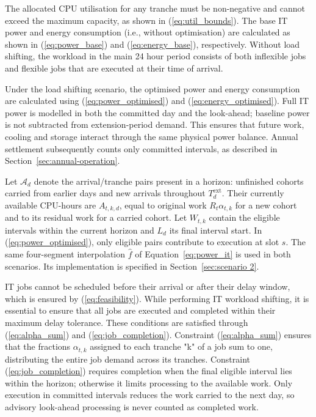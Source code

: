\documentclass[lettersize,journal]{IEEEtran}
\begin{document}
The allocated CPU utilisation for any tranche must be non-negative and cannot exceed the maximum capacity, as shown in (\ref{eq:util_bounds}). The base IT power and energy consumption (i.e., without optimisation) are calculated as shown in (\ref{eq:power_base}) and (\ref{eq:energy_base}), respectively. Without load shifting, the workload in the main 24 hour period consists of both inflexible jobs and flexible jobs that are executed at their time of arrival.

Under the load shifting scenario, the optimised power and energy consumption are calculated using (\ref{eq:power_optimised}) and (\ref{eq:energy_optimised}). Full IT power is modelled in both the committed day and the look-ahead; baseline power is not subtracted from extension-period demand. This ensures that future work, cooling and storage interact through the same physical power balance. Annual settlement subsequently counts only committed intervals, as described in Section~\ref{sec:annual-operation}.

Let $\mathcal A_d$ denote the arrival/tranche pairs present in a horizon: unfinished cohorts carried from earlier days and new arrivals throughout $T_d^{\mathrm{ext}}$. Their currently available CPU-hours are $A_{t,k,d}$, equal to original work $R_t\alpha_{t,k}$ for a new cohort and to its residual work for a carried cohort. Let $W_{t,k}$ contain the eligible intervals within the current horizon and $L_d$ its final interval start. In (\ref{eq:power_optimised}), only eligible pairs contribute to execution at slot $s$. The same four-segment interpolation $\widehat f$ of Equation~\ref{eq:power_it} is used in both scenarios. Its implementation is specified in Section~\ref{sec:scenario 2}.

IT jobs cannot be scheduled before their arrival or after their delay window, which is ensured by (\ref{eq:feasibility}). While performing IT workload shifting, it is essential to ensure that all jobs are executed and completed within their maximum delay tolerance. These conditions are satisfied through (\ref{eq:alpha_sum}) and (\ref{eq:job_completion}). Constraint (\ref{eq:alpha_sum}) ensures that the fractions $\alpha_{t,k}$ assigned to each tranche "k" of a job sum to one, distributing the entire job demand across its tranches. Constraint (\ref{eq:job_completion}) requires completion when the final eligible interval lies within the horizon; otherwise it limits processing to the available work. Only execution in committed intervals reduces the work carried to the next day, so advisory look-ahead processing is never counted as completed work.
\end{document}
